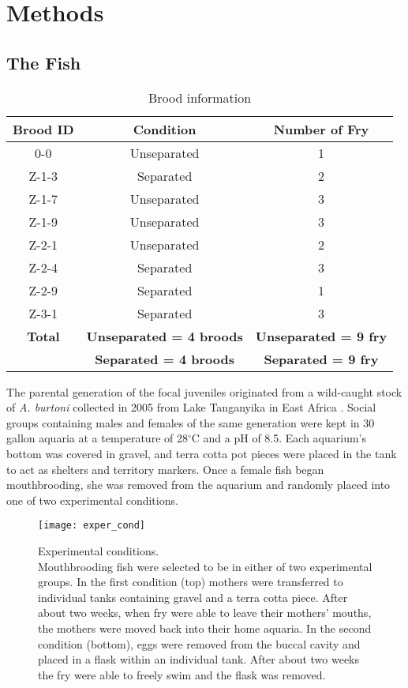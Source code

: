 \documentclass[12pt,twoside]{reedthesis}
\begin{document}
\chapter{Methods}
\section{The Fish}
\begin{table}[htbp]
\caption[Brood information]{Brood information}
\begin{center}
\footnotesize
\begin{tabular}{ | c | c | c |}
\hline
\textbf{Brood ID} & \textbf{Condition} & \textbf{Number of Fry}\\
\hline
0-0 & Unseparated & 1\\
\hline
Z-1-3 & Separated & 2\\
  \hline
  Z-1-7 & Unseparated & 3\\
  \hline
Z-1-9 & Unseparated & 3\\
\hline
Z-2-1 & Unseparated & 2 \\
  \hline
Z-2-4 & Separated & 3 \\
\hline
Z-2-9 & Separated & 1 \\
\hline
Z-3-1 & Separated & 3 \\
  \hline
  \textbf{Total} & \textbf{Unseparated = 4 broods} & \textbf{Unseparated = 9 fry}\\
  & \textbf{Separated = 4 broods} & \textbf{Separated = 9 fry}\\
  \hline
\end{tabular}
\end{center}
\end{table}


The parental generation of the focal juveniles originated from a wild-caught
stock of \textit{A. burtoni} collected in 2005 from Lake Tanganyika in East
Africa \citep{renn_maternal_2009}.
Social groups containing males and females of the same generation were kept in
30 gallon aquaria at a temperature of 28$^\circ$C and a pH of 8.5. Each aquarium's bottom
was covered in gravel, and terra cotta pot pieces were placed in the tank to act
as shelters and territory markers. Once a female fish began mouthbrooding, she
was removed from the aquarium and randomly placed into one of two experimental
conditions.

\begin{figure}[htbp] 
\begin{centering} 
\texttt{[image: exper\_cond]}
\caption[Experimental conditions]{\footnotesize{Experimental conditions.\\
    Mouthbrooding fish were selected to be in either of two experimental groups.
  In the first condition (top) mothers were transferred to individual tanks
  containing gravel and a terra cotta piece. After about two weeks, when fry were
able to leave their mothers' mouths, the mothers were moved back into their home
aquaria. In the second condition (bottom), eggs were removed from the buccal
cavity and placed in a flask within an individual tank. After about two weeks
the fry were able to freely swim and the flask was removed.}} 
\label{subd}
\end{centering} 
\end{figure}
\end{document}
